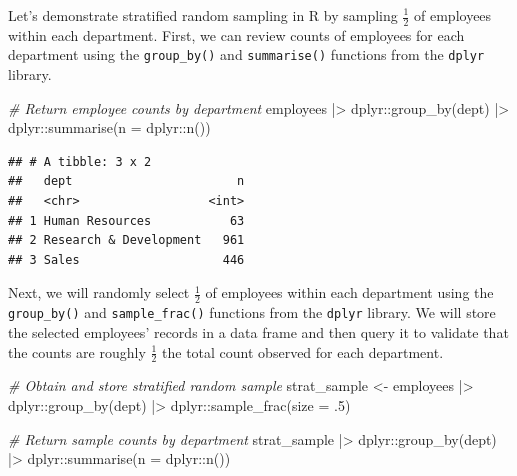 \documentclass[
]{book}
\newenvironment{Shaded}{\begin{snugshade}}{\end{snugshade}}
\newcommand{\AttributeTok}[1]{\textcolor[rgb]{0.77,0.63,0.00}{#1}}
\newcommand{\CommentTok}[1]{\textcolor[rgb]{0.56,0.35,0.01}{\textit{#1}}}
\newcommand{\DecValTok}[1]{\textcolor[rgb]{0.00,0.00,0.81}{#1}}
\newcommand{\FunctionTok}[1]{\textcolor[rgb]{0.00,0.00,0.00}{#1}}
\newcommand{\NormalTok}[1]{#1}
\newcommand{\OtherTok}[1]{\textcolor[rgb]{0.56,0.35,0.01}{#1}}
\newcommand{\SpecialCharTok}[1]{\textcolor[rgb]{0.00,0.00,0.00}{#1}}
\begin{document}
Let's demonstrate stratified random sampling in R by sampling \(\frac{1}{2}\) of employees within each department. First, we can review counts of employees for each department using the \texttt{group\_by()} and \texttt{summarise()} functions from the \texttt{dplyr} library.

\begin{Shaded}
\begin{Highlighting}[]
\CommentTok{\# Return employee counts by department}
\NormalTok{employees }\SpecialCharTok{|\textgreater{}}
\NormalTok{dplyr}\SpecialCharTok{::}\FunctionTok{group\_by}\NormalTok{(dept) }\SpecialCharTok{|\textgreater{}}
\NormalTok{dplyr}\SpecialCharTok{::}\FunctionTok{summarise}\NormalTok{(}\AttributeTok{n =}\NormalTok{ dplyr}\SpecialCharTok{::}\FunctionTok{n}\NormalTok{())}
\end{Highlighting}
\end{Shaded}

\begin{verbatim}
## # A tibble: 3 x 2
##   dept                       n
##   <chr>                  <int>
## 1 Human Resources           63
## 2 Research & Development   961
## 3 Sales                    446
\end{verbatim}

Next, we will randomly select \(\frac{1}{2}\) of employees within each department using the \texttt{group\_by()} and \texttt{sample\_frac()} functions from the \texttt{dplyr} library. We will store the selected employees' records in a data frame and then query it to validate that the counts are roughly \(\frac{1}{2}\) the total count observed for each department.

\begin{Shaded}
\begin{Highlighting}[]
\CommentTok{\# Obtain and store stratified random sample}
\NormalTok{strat\_sample }\OtherTok{\textless{}{-}}\NormalTok{ employees }\SpecialCharTok{|\textgreater{}}
\NormalTok{                dplyr}\SpecialCharTok{::}\FunctionTok{group\_by}\NormalTok{(dept) }\SpecialCharTok{|\textgreater{}}
\NormalTok{                dplyr}\SpecialCharTok{::}\FunctionTok{sample\_frac}\NormalTok{(}\AttributeTok{size =}\NormalTok{ .}\DecValTok{5}\NormalTok{)}

\CommentTok{\# Return sample counts by department}
\NormalTok{strat\_sample }\SpecialCharTok{|\textgreater{}}
\NormalTok{dplyr}\SpecialCharTok{::}\FunctionTok{group\_by}\NormalTok{(dept) }\SpecialCharTok{|\textgreater{}}
\NormalTok{dplyr}\SpecialCharTok{::}\FunctionTok{summarise}\NormalTok{(}\AttributeTok{n =}\NormalTok{ dplyr}\SpecialCharTok{::}\FunctionTok{n}\NormalTok{())}
\end{Highlighting}
\end{Shaded}
\end{document}
